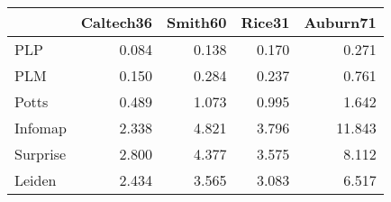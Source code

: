 \begin{tabular}{lrrrr}
\toprule
{} & Caltech36 & Smith60 & Rice31 & Auburn71 \\
\midrule
PLP      &     0.084 &   0.138 &  0.170 &    0.271 \\
PLM      &     0.150 &   0.284 &  0.237 &    0.761 \\
Potts    &     0.489 &   1.073 &  0.995 &    1.642 \\
Infomap  &     2.338 &   4.821 &  3.796 &   11.843 \\
Surprise &     2.800 &   4.377 &  3.575 &    8.112 \\
Leiden   &     2.434 &   3.565 &  3.083 &    6.517 \\
\bottomrule
\end{tabular}
